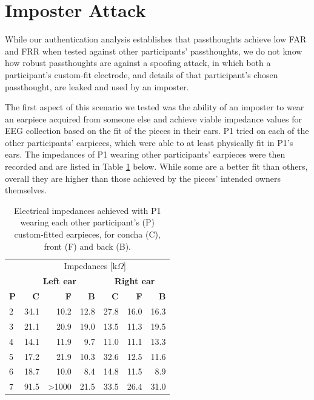 \documentclass{sigchi}
\begin{document}
\section{Imposter Attack}

While our authentication analysis establishes that passthoughts achieve low FAR and FRR when tested against other participants' passthoughts, we do not know how robust passthoughts are against a spoofing attack, in which both a participant's custom-fit electrode, and details of that participant's chosen passthought, are leaked and used by an imposter. 

The first aspect of this scenario we tested was the ability of an imposter to wear an earpiece acquired from someone else and achieve viable impedance values for EEG collection based on the fit of the pieces in their ears. P1 tried on each of the other participants' earpieces, which were able to at least physically fit in P1's ears. The impedances of P1 wearing other participants' earpieces were then recorded and are listed in Table \ref{tab:imposter_impedances} below. While some are a better fit than others, overall they are higher than those achieved by the pieces' intended owners themselves.

\begin{table}[h]
\begin{center}
\begin{tabular}{lrrrrrr}
& \multicolumn{6}{c}{Impedances [k\(\Omega\)]} \\
\cline{2-7}
& \multicolumn{3}{|c|}{\textbf{Left ear}} & \multicolumn{3}{c|}{\textbf{Right ear}} \\
\textbf{P} & \textbf{C} & \textbf{F} & \textbf{B} & \textbf{C} & \textbf{F} & \textbf{B} \\
\hline
2 & 34.1 & 10.2 & 12.8 & 27.8 & 16.0 & 16.3\\
3 & 21.1 & 20.9 & 19.0 & 13.5 & 11.3 & 19.5\\
4 & 14.1 & 11.9 & 9.7 & 11.0 & 11.1 & 13.3\\
5 & 17.2 & 21.9 & 10.3 & 32.6 & 12.5 & 11.6\\
6 & 18.7 & 10.0 & 8.4 & 14.8 & 11.5 & 8.9\\
7 & 91.5 & \textgreater1000 & 21.5 & 33.5 & 26.4 & 31.0\\
\end{tabular}
\end{center}
\caption{Electrical impedances achieved with P1 wearing each other participant's (P) custom-fitted earpieces, for concha (C), front (F) and back (B).}
\label{tab:imposter_impedances}
\end{table}
\end{document}
